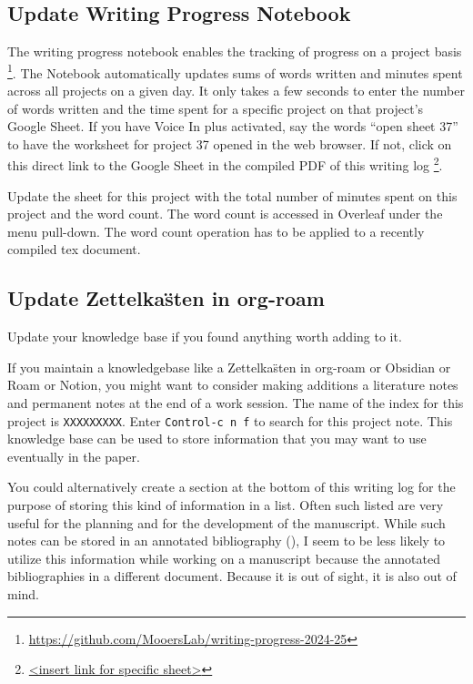 \documentclass[10pt,letterpaper]{article}
\begin{document}
\subsection{Update Writing Progress Notebook}
\label{sub:WPsheet}
The writing progress notebook enables the tracking of progress on a project basis \footnote{\url{https://github.com/MooersLab/writing-progress-2024-25}}.
The Notebook automatically updates sums of words written and minutes spent across all projects on a given day.
It only takes a few seconds to enter the number of words written and the time spent for a specific project on that project's Google Sheet. 
If you have Voice In plus activated, say the words ``open sheet 37'' to have the worksheet for project 37 opened in the web browser.
If not, click on this direct link to the Google Sheet in the compiled PDF of this writing log \footnote{\url{<insert link for specific sheet>}}.

Update the sheet for this project with the total number of minutes spent on this project and the word count.
The word count is accessed in Overleaf under the menu pull-down.
The word count operation has to be applied to a recently compiled tex document.






\subsection{Update Zettelka\"sten in org-roam}
\label{sub:zk}
Update your knowledge base if you found anything worth adding to it.

If you maintain a knowledgebase like a Zettelka\"sten in org-roam or Obsidian or Roam or Notion, you might want to consider making additions a literature notes and permanent notes at the end of a work session.
The name of the index for this project is \verb|XXXXXXXXX|.
Enter \texttt{Control-c n f} to search for this project note.
This knowledge base can be used to store information that you may want to use eventually in the paper.

You could alternatively create a section at the bottom of this writing log for the purpose of storing this kind of information in a list.
Often such listed are very useful for the planning and for the development of the manuscript.
While such notes can be stored in an annotated bibliography (), I seem to be less likely to utilize this information while working on a manuscript because the annotated bibliographies in a different document.
Because it is out of sight, it is also out of mind.
\end{document}
